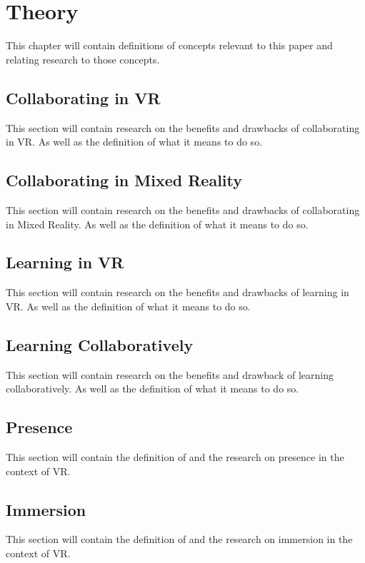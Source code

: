 \chapter{Theory} %
This chapter will contain definitions of concepts relevant to this paper and relating research to those concepts. %
    \section{Collaborating in VR} %
    This section will contain research on the benefits and drawbacks of collaborating in VR. As well as the definition of what it means to do so.
    
    \section{Collaborating in Mixed Reality}
    This section will contain research on the benefits and drawbacks of collaborating in Mixed Reality. As well as the definition of what it means to do so.
    
    \section{Learning in VR} %
    This section will contain research on the benefits and drawbacks of learning in VR. As well as the definition of what it means to do so.
    
    \section{Learning Collaboratively} %
    This section will contain research on the benefits and drawback of learning collaboratively. As well as the definition of what it means to do so.
    
    \section{Presence} %
    This section will contain the definition of and the research on presence in the context of VR.
    
    \section{Immersion} %
    This section will contain the definition of and the research on immersion in the context of VR.